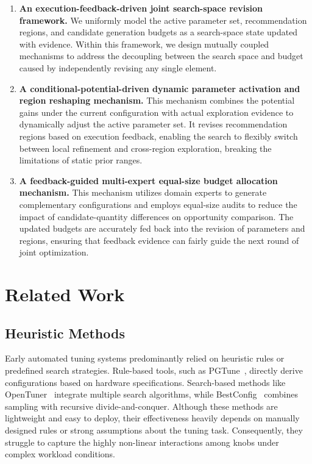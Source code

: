 \documentclass[runningheads]{llncs}
\begin{document}
\begin{enumerate}
    \item \textbf{An execution-feedback-driven joint search-space revision
    framework.} We uniformly model the active parameter set,
    recommendation regions, and candidate generation budgets as a
    search-space state updated with evidence. Within this framework, we
    design mutually coupled mechanisms to address the decoupling between
    the search space and budget caused by independently revising any
    single element.

    \item \textbf{A conditional-potential-driven dynamic parameter
    activation and region reshaping mechanism.} This mechanism combines
    the potential gains under the current configuration with actual
    exploration evidence to dynamically adjust the active parameter set.
    It revises recommendation regions based on execution feedback,
    enabling the search to flexibly switch between local refinement and
    cross-region exploration, breaking the limitations of static prior
    ranges.

    \item \textbf{A feedback-guided multi-expert equal-size budget
    allocation mechanism.} This mechanism utilizes domain experts to
    generate complementary configurations and employs equal-size audits
    to reduce the impact of candidate-quantity differences on opportunity
    comparison. The updated budgets are accurately fed back into the
    revision of parameters and regions, ensuring that feedback evidence
    can fairly guide the next round of joint optimization.
\end{enumerate}

\section{Related Work}

\subsection{Heuristic Methods}
Early automated tuning systems predominantly relied on heuristic rules
or predefined search strategies. Rule-based tools, such as
PGTune~\cite{pgtune}, directly derive configurations based on hardware
specifications. Search-based methods like OpenTuner~\cite{opentuner}
integrate multiple search algorithms, while BestConfig~\cite{bestconfig}
combines sampling with recursive divide-and-conquer. Although these
methods are lightweight and easy to deploy, their effectiveness heavily
depends on manually designed rules or strong assumptions about the tuning
task. Consequently, they struggle to capture the highly non-linear
interactions among knobs under complex workload conditions.
\end{document}
